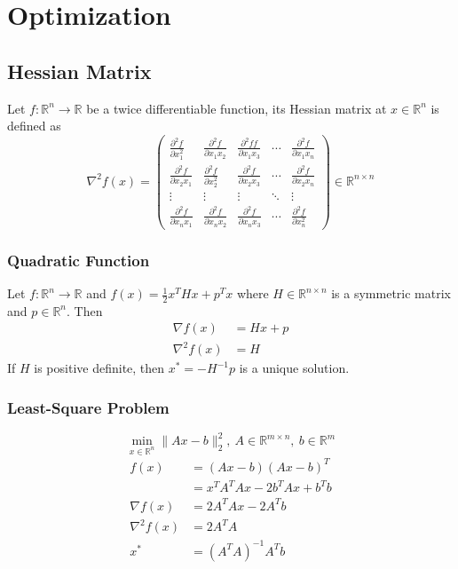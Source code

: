 \documentclass[../main.tex]{subfiles}
\begin{document}
    \section{Optimization}
        \subsection{Hessian Matrix}
            Let $f:\mathbb{R}^n\rightarrow\mathbb{R}$ be a twice differentiable function, its Hessian matrix at $x\in\mathbb{R}^n$ is defined as
            \[
                \nabla^2f(x)=
                \begin{pmatrix}
                    \frac{\partial^2 f}{\partial x_1^2} & \frac{\partial^2 f}{\partial x_1x_2} & \frac{\partial^2ff}{\partial x_1x_3}&\cdots&\frac{\partial^2 f}{\partial x_1x_n}\\[0.2cm]
                    \frac{\partial^2 f}{\partial x_2x_1} & \frac{\partial^2 f}{\partial x_2^2} & \frac{\partial^2 f}{\partial x_2x_3} & \cdots & \frac{\partial^2 f}{\partial x_2x_n}\\[0.2cm]
                    \vdots & \vdots &\vdots & \ddots &\vdots\\[0.2cm]
                    \frac{\partial^2 f}{\partial x_nx_1} & \frac{\partial^2 f}{\partial x_nx_2} & \frac{\partial^2 f}{\partial x_nx_3} & \cdots & \frac{\partial^2 f}{\partial x_n^2}
                \end{pmatrix}
                \in\mathbb{R}^{n \times n}
            \]
            \subsubsection{Quadratic Function}
                Let $f:\mathbb{R}^n\rightarrow\mathbb{R}$ and $f(x)=\frac{1}{2}x^THx+p^Tx$ where $H \in \mathbb{R}^{n \times n}$ is a symmetric matrix and $p \in \mathbb{R}^n$. Then
                \begin{align*}
                    \nabla f(x) &= Hx+p \\
                    \nabla^2 f(x) &= H
                \end{align*}
                If $H$ is positive definite, then $x^*=-H^{-1}p$ is a unique solution.
            
            \subsubsection{Least-Square Problem}
                \[
                    \min_{x \in \mathbb{R}^n}\|Ax - b\|_2^2,~A \in \mathbb{R}^{m \times n},~b \in \mathbb{R}^m
                \]
                \begin{align*}
                    f(x) &= (Ax - b)(Ax - b)^T \\
                         &= x^TA^TAx - 2b^TAx + b^Tb \\
                    \nabla f(x) &= 2A^TAx - 2A^Tb \\
                    \nabla^2 f(x) &= 2A^TA \\
                    x^* &= (A^TA)^{-1}A^Tb
                \end{align*}
\end{document}
